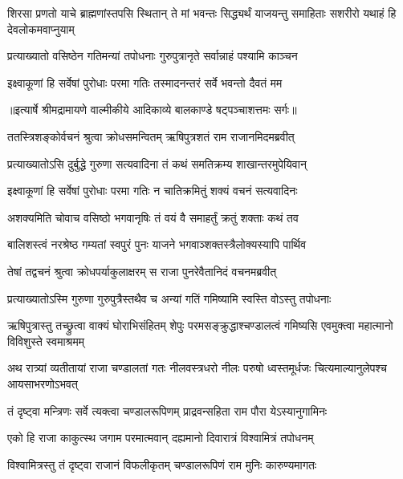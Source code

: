 \threelineshloka
{शिरसा प्रणतो याचे ब्राह्मणांस्तपसि स्थितान्}
{ते मां भवन्तः सिद्ध्यर्थं याजयन्तु समाहिताः}
{सशरीरो यथाहं हि देवलोकमवाप्नुयाम्} %

\twolineshloka
{प्रत्याख्यातो वसिष्ठेन गतिमन्यां तपोधनाः}
{गुरुपुत्रानृते सर्वान्नाहं पश्यामि काञ्चन} %

\twolineshloka
{इक्ष्वाकूणां हि सर्वेषां पुरोधाः परमा गतिः}
{तस्मादनन्तरं सर्वे भवन्तो दैवतं मम} %


{॥इत्यार्षे श्रीमद्रामायणे वाल्मीकीये आदिकाव्ये बालकाण्डे षट्पञ्चाशत्तमः सर्गः॥}


\twolineshloka
{ततस्त्रिशङ्कोर्वचनं श्रुत्वा क्रोधसमन्वितम्}
{ऋषिपुत्रशतं राम राजानमिदमब्रवीत्} %

\twolineshloka
{प्रत्याख्यातोऽसि दुर्बुद्धे गुरुणा सत्यवादिना}
{तं कथं समतिक्रम्य शाखान्तरमुपेयिवान्} %

\twolineshloka
{इक्ष्वाकूणां हि सर्वेषां पुरोधाः परमा गतिः}
{न चातिक्रमितुं शक्यं वचनं सत्यवादिनः} %

\twolineshloka
{अशक्यमिति चोवाच वसिष्ठो भगवानृषिः}
{तं वयं वै समाहर्तुं क्रतुं शक्ताः कथं तव} %

\twolineshloka
{बालिशस्त्वं नरश्रेष्ठ गम्यतां स्वपुरं पुनः}
{याजने भगवाञ्शक्तस्त्रैलोक्यस्यापि पार्थिव} %

\twolineshloka
{तेषां तद्वचनं श्रुत्वा क्रोधपर्याकुलाक्षरम्}
{स राजा पुनरेवैतानिदं वचनमब्रवीत्} %

\twolineshloka
{प्रत्याख्यातोऽस्मि गुरुणा गुरुपुत्रैस्तथैव च}
{अन्यां गतिं गमिष्यामि स्वस्ति वोऽस्तु तपोधनाः} %

\threelineshloka
{ऋषिपुत्रास्तु तच्छ्रुत्वा वाक्यं घोराभिसंहितम्}
{शेपुः परमसङ्क्रुद्धाश्चण्डालत्वं गमिष्यसि}
{एवमुक्त्वा महात्मानो विविशुस्ते स्वमाश्रमम्} %

\threelineshloka
{अथ रात्र्यां व्यतीतायां राजा चण्डालतां गतः}
{नीलवस्त्रधरो नीलः परुषो ध्वस्तमूर्धजः}
{चित्यमाल्यानुलेपश्च आयसाभरणोऽभवत्} %

\twolineshloka
{तं दृष्ट्वा मन्त्रिणः सर्वे त्यक्त्वा चण्डालरूपिणम्}
{प्राद्रवन्सहिता राम पौरा येऽस्यानुगामिनः} %

\twolineshloka
{एको हि राजा काकुत्स्थ जगाम परमात्मवान्}
{दह्यमानो दिवारात्रं विश्वामित्रं तपोधनम्} %

\twolineshloka
{विश्वामित्रस्तु तं दृष्ट्वा राजानं विफलीकृतम्}
{चण्डालरूपिणं राम मुनिः कारुण्यमागतः} %

